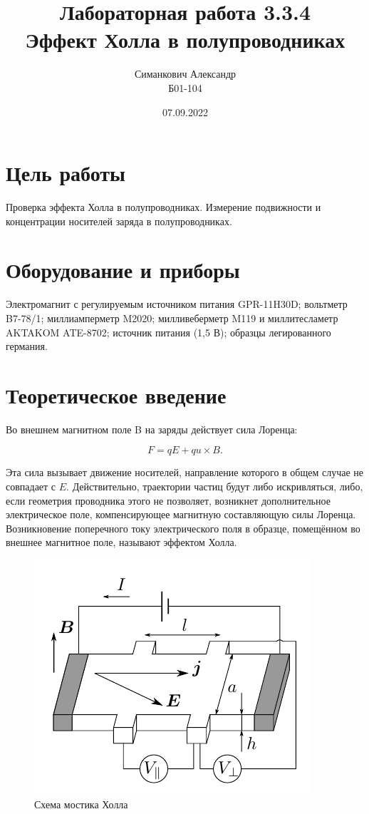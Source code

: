 \documentclass[12pt,a4paper]{article}
\title{Лабораторная работа 3.3.4\\ Эффект Холла в полупроводниках}
\author{Симанкович Александр \\ Б01-104}
\date{07.09.2022}
\begin{document}
	\maketitle
	
	\section*{Цель работы}
	
	Проверка эффекта Холла в полупроводниках.
	Измерение подвижности и концентрации носителей заряда в полупроводниках.
	
	\section*{Оборудование и приборы}
	Электромагнит с регулируемым источником пи­тания GPR-11H30D;
	вольтметр B7-78/1;
	миллиамперметр M2020;
	милливеберметр M119 и мил­литесламетр AKTAKOM ATE-8702;
	источник питания (1,5 В);
	образцы легированного германия.
	
	\section*{Теоретическое введение}
	
	Во внешнем магнитном поле B на заряды действует сила Лоренца:
	
	$$ F = qE + qu \times B.$$
	
	Эта сила вызывает движение носителей, направление которого в общем случае не совпадает с $E$. Действительно, траектории частиц будут ли­бо искривляться, либо, если геометрия проводника этого не позволя­ет, возникнет дополнительное электрическое поле, компенсирующее маг­нитную составляющую силы Лоренца. Возникновение поперечного току электрического поля в образце, помещённом во внешнее магнитное поле, называют эффектом Холла.
	
	\begin{figure}[h]
		\includegraphics[scale=0.65]{res/scheme_hall.png}
		\caption{Схема мостика Холла}
		\label{scheme_hall}
	\end{figure}
\end{document}
